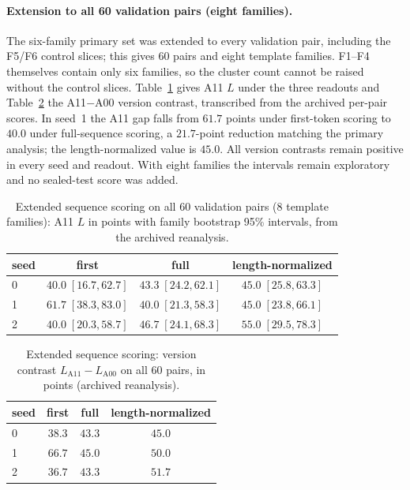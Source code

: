 \documentclass[11pt,twocolumn]{article}
\begin{document}
\paragraph{Extension to all 60 validation pairs (eight families).}
The six-family primary set was extended to every validation pair, including the
F5/F6 control slices; this gives 60 pairs and eight template families. F1--F4
themselves contain only six families, so the cluster count cannot be raised
without the control slices. Table~\ref{tab:extendedseq} gives A11 $L$ under the
three readouts and Table~\ref{tab:extendedcontrast} the A11$-$A00 version
contrast, transcribed from the archived per-pair scores. In seed~1 the A11 gap
falls from $61.7$ points under first-token scoring to $40.0$ under
full-sequence scoring, a $21.7$-point reduction matching the primary analysis;
the length-normalized value is $45.0$. All version contrasts remain positive in
every seed and readout. With eight families the intervals remain exploratory
and no sealed-test score was added.

\begin{table}[t]
\centering
\caption{Extended sequence scoring on all 60 validation pairs (8 template
families): A11 $L$ in points with family bootstrap 95\% intervals, from the
archived reanalysis.}
\label{tab:extendedseq}
\begin{tabular}{lccc}
\toprule
seed & first & full & length-normalized \\
\midrule
0 & $40.0\;[16.7,62.7]$ & $43.3\;[24.2,62.1]$ & $45.0\;[25.8,63.3]$ \\
1 & $61.7\;[38.3,83.0]$ & $40.0\;[21.3,58.3]$ & $45.0\;[23.8,66.1]$ \\
2 & $40.0\;[20.3,58.7]$ & $46.7\;[24.1,68.3]$ & $55.0\;[29.5,78.3]$ \\
\bottomrule
\end{tabular}
\end{table}

\begin{table}[t]
\centering
\caption{Extended sequence scoring: version contrast $L_{\mathrm{A11}}-
L_{\mathrm{A00}}$ on all 60 pairs, in points (archived reanalysis).}
\label{tab:extendedcontrast}
\begin{tabular}{lccc}
\toprule
seed & first & full & length-normalized \\
\midrule
0 & $38.3$ & $43.3$ & $45.0$ \\
1 & $66.7$ & $45.0$ & $50.0$ \\
2 & $36.7$ & $43.3$ & $51.7$ \\
\bottomrule
\end{tabular}
\end{table}
\end{document}
